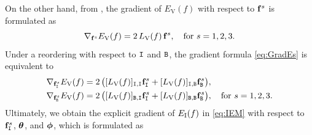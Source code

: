\documentclass[11pt,a4paper]{article}
\def\rV{\mathrm{V}}
\begin{document}
On the other hand, from \cite[Theorem 3.5]{HuLL23}, the gradient of $E_\rV(f)$ with respect to $\mathbf{f}^s$ is formulated as 
\begin{equation} 
\nabla_{\f^s} E_\rV(f) = 2 \, L_\mathrm{V}(f) \,\f^s, ~~~ \text{for $s=1,2,3$}.
\label{eq:GradEs}
\end{equation}
Under a reordering with respect to $\mathtt{I}$ and $\mathtt{B}$, the gradient formula \eqref{eq:GradEs} is equivalent to
\begin{subequations}
\begin{align}
\nabla_{\f^s_\I} E_\rV(f) &= 2 \, \big( [L_\rV(f)]_{\I,\I} \f^s_\I + [L_\rV(f)]_{\I,\B} \f^s_\B \big), \label{eq:EV_grad_I}\\
\nabla_{\f^s_\B} E_\rV(f) &= 2 \, \big( [L_\rV(f)]_{\B,\I} \f_\I^s + [L_\rV(f)]_{\B,\B} \f_\B^s \big), ~~~ \text{for $s=1,2,3$}. 
\end{align}
\end{subequations}
Ultimately, we obtain the explicit gradient of $E_{\mathrm{I}}(f)$ in  \eqref{eq:IEM} with respect to $\mathbf{f}_{\mathtt{I}}^s$, ${\boldsymbol{\theta}}$, and ${\boldsymbol{\phi}}$, which is formulated as 
\end{document}
